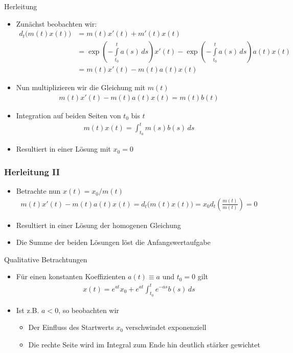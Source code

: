\begin{frame}{Herleitung}
  \begin{itemize}
  \item<+-> Zunächst beobachten wir:
    \begin{align*}
      d_t \bigl(m(t)x(t)\bigr)
      &= m(t) x'(t) + m'(t) x(t)\\
      &= \exp\left({\scriptstyle -\int\limits_{t_0}^t a(s)\,ds}\right) x'(t)
        - \exp\left({\scriptstyle-\int\limits_{t_0}^t a(s)\,ds}\right) a(t) x(t)
      \\
      &= m(t) x'(t) - m(t) a(t) x(t)
    \end{align*}
  \item<+-> Nun multiplizieren wir die Gleichung mit $m(t)$
    \begin{gather*}
      m(t) x'(t) - m(t) a(t) x(t) = m(t) b(t)
    \end{gather*}
  \item<+-> Integration auf beiden Seiten von $t_0$ bis $t$
    \begin{gather*}
      m(t)x(t) = \int_{t_0}^t m(s)b(s)\,ds
    \end{gather*}
  \item<+-> Resultiert in einer Lösung mit $x_0=0$
  \end{itemize}
\end{frame}

\begin{frame}
  \frametitle<presentation>{Herleitung II}
  \begin{itemize}
  \item<+-> Betrachte nun $x(t) = x_0/m(t)$
    \begin{gather*}
      m(t) x'(t) - m(t) a(t) x(t)
      = 
      d_t \bigl(m(t)x(t)\bigr)
      = x_0 d_t\left(\frac{m(t)}{m(t)}\right) = 0 
    \end{gather*}
  \item <+-> Resultiert in einer Lösung der homogenen Gleichung
  \item <+-> Die Summe der beiden Lösungen löst die Anfangswertaufgabe
  \end{itemize}
\end{frame}

\begin{frame}{Qualitative Betrachtungen}
  \begin{itemize}
  \item Für einen konstanten Koeffizienten $a(t) \equiv a$ und $t_0=0$ gilt
    \begin{gather*}
      x(t) = e^{at} x_0+ e^{at}\int_{t_0}^t e^{-as} b(s)\,ds
    \end{gather*}
  \item Ist z.B. $a<0$, so beobachten wir
    \begin{itemize}
    \item Der Einfluss des Startwerts $x_0$ verschwindet exponenziell
    \item Die rechte Seite wird im Integral zum Ende hin deutlich stärker gewichtet
    \end{itemize}
  \end{itemize}
\end{frame}

